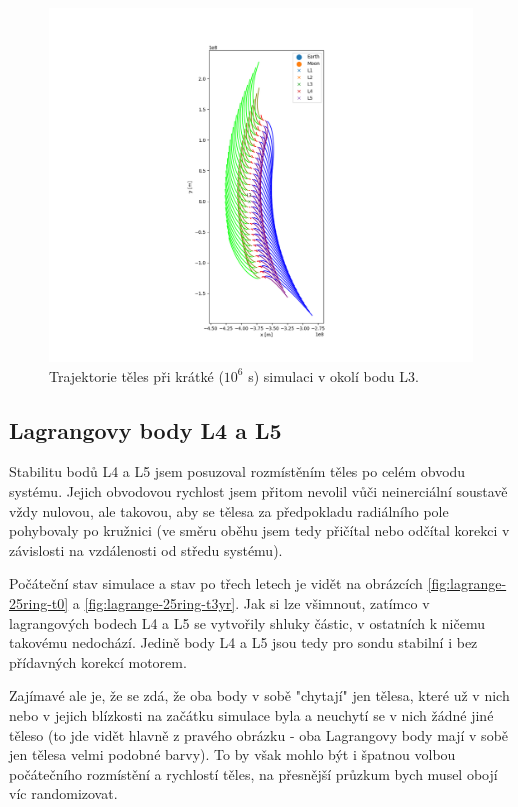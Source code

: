 \documentclass[a4paper,11pt]{article}
\begin{document}
\begin{figure}[h!]
    \centering
    \includegraphics[width=.9\textwidth]{l3_orbits.png}

    \caption{Trajektorie těles při krátké ($10^6$ s) simulaci v okolí bodu L3.}
    \label{fig:l3_orbits}
\end{figure}

\subsection{Lagrangovy body L4 a L5}

Stabilitu bodů L4 a L5 jsem posuzoval rozmístěním těles po celém obvodu systému. Jejich obvodovou 
rychlost jsem přitom nevolil vůči neinerciální soustavě vždy nulovou, ale takovou, aby se tělesa za předpokladu radiálního
pole pohybovaly po kružnici (ve směru oběhu jsem tedy přičítal nebo odčítal korekci v závislosti na vzdálenosti od středu systému).

Počáteční stav simulace a stav po třech letech je vidět na obrázcích \ref{fig:lagrange-25ring-t0} a \ref{fig:lagrange-25ring-t3yr}.
Jak si lze všimnout, zatímco v lagrangových bodech L4 a L5 se vytvořily shluky částic, v ostatních k ničemu takovému nedochází.
Jedině body L4 a L5 jsou tedy pro sondu stabilní i bez přídavných korekcí motorem.

Zajímavé ale je, že se zdá, že oba body v sobě "chytají" jen tělesa, které už v nich nebo v jejich blízkosti na začátku simulace byla
a neuchytí se v nich žádné jiné těleso (to jde vidět hlavně z pravého obrázku - oba Lagrangovy body mají v sobě
jen tělesa velmi podobné barvy). To by však mohlo být i špatnou volbou počátečního rozmístění a rychlostí těles,
na přesnější průzkum bych musel obojí víc randomizovat.
\end{document}
